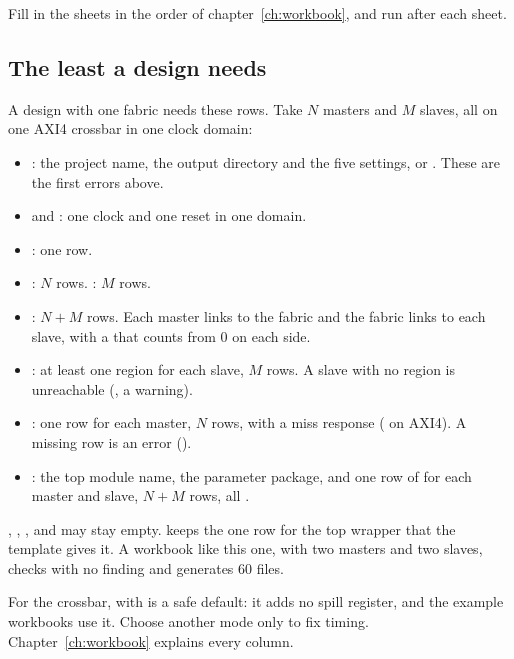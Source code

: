 

Fill in the sheets in the order of chapter~\ref{ch:workbook}, and run 
after each sheet.

\subsection{The least a design needs}

A design with one fabric needs these rows. Take $N$ masters and $M$ slaves, all on one
AXI4 crossbar in one clock domain:

\begin{itemize}
\item {}: the project name, the output directory and the five
   settings,  or . These are the first errors above.
\item {} and : one clock and one reset in one domain.
\item {}: one row.
\item {}: $N$ rows. : $M$ rows.
\item {}: $N+M$ rows. Each master links to the fabric and the fabric
  links to each slave, with a  that counts from 0 on each side.
\item {}: at least one region for each slave, $M$ rows. A slave with
  no region is unreachable (, a warning).
\item {}: one row for each master, $N$ rows, with a miss response
  ( on AXI4). A missing row is an error ().
\item {}: the top module name, the parameter package, and one row of
   for each master and slave, $N+M$ rows, all .
\end{itemize}

, , ,  and
 may stay empty.  keeps the one row for the top
wrapper that the template gives it. A workbook like this one, with two masters and two
slaves, checks with no finding and generates 60 files.

For the crossbar,  with   is a safe
default: it adds no spill register, and the example workbooks use it. Choose another mode
only to fix timing. Chapter~\ref{ch:workbook} explains every column.

